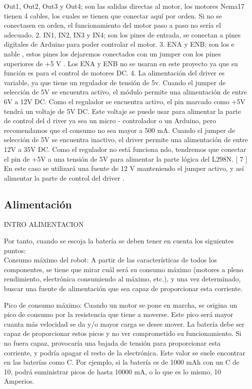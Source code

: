 Out1, Out2, Out3 y Out4; son las salidas directas al motor, los motores Nema17 tienen  4  cables,  los  cuales  se  tienen  que  conectar  aquí  por  orden.  Si  no  se 
conectasen  en  orden,  el funcionamiento  del  motor  paso  a  paso  no  sería  el 
adecuado.
2.
IN1,  IN2,  IN3  y  IN4;  son  los  pines  de  entrada,  se  conectan  a  pines  digitales  de 
Arduino para poder controlar el motor.
3.
ENA y ENB; son los 
e
nable
, estos pines los dejaremos conectados con un 
jumper
con los pines superiores de +5
V
. Los ENA y ENB no se usaran en este proyecto ya 
que su función es para el control de motores DC.
4.
La alimentación del 
driver
es variable, ya que tiene un regulador de tensión de 5v. 
Cuando el 
jumper
de selección de 5V se encuentra
activo, el módulo permite una 
alimentación de entre
6V a 12V DC. Como el regulador se encuentra activo, el pin 
marcado como +5V tendrá un voltaje de 5V DC. Este voltaje se puede usar para 
alimentar la parte de control del 
d
river
ya sea un micro
-
controlador o un Arduino, 
pero recomendamos que el consumo no sea mayor a 500 mA. 
Cuando el jumper de selección de 5V se encuentra
inactivo, el 
driver
permite una 
alimentación  de  entre
12V  a  35V  DC.  Como  el  regulador  no  está  funciona
ndo, 
tendremos que conectar el pin de +5V a una tensión de 5V para alimentar la parte 
lógica del L298N. [
7
]
En  este  caso  se  utilizará  una  fuente  de  12
V
manteniendo  el 
jumper
activo,  y  así 
alimentar la parte de control del 
driver
.








\subsection{Alimentación}
\label{sub:alimentación}

INTRO ALIMENTACION

Por tanto, cuando se escoja la batería se deben tener en cuenta los siguientes puntos:\\

Consumo máximo del robot: A partir de las características de todos los
componentes, se tiene que mirar cuál será su consumo máximo (motores a pleno
rendimiento, electrónica consumiendo al máximo, etc.), y una vez determinado,
buscar una fuente de alimentación que sea capaz de proporcionar esta corriente.

Pico de consumo máximo: Cuando un motor se pone en marcha, se origina un
pico de consumo por la resistencia que tiene a moverse. Este pico será mayor
cuanta más velocidad se da y/o mayor carga se desee mover. La batería debe ser
capaz de proporcionar estos picos y no ver comprometido su funcionamiento. Si no
fuera capaz, provocaría una bajada de tensión para proporcionar esta corriente, y
podría apagar el resto de la electrónica. Este valor se suele encontrar en las
baterías como C. Por ejemplo, si la batería es de 1000 mAh con un C de 10, podrá
suministrar picos de hasta 10000 mA, o lo que es lo mismo, 10 Amperios.

